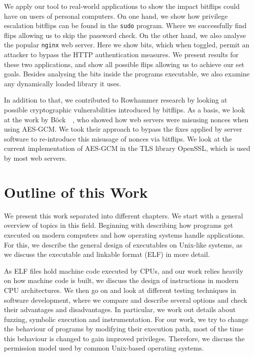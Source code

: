 We apply our tool to real-world applications to show the impact bitflips could
have on users of personal computers. On one hand, we show how privilege
escalation bitflips can be found in the \texttt{sudo} program. Where we
successfully find flips allowing us to skip the password check. On the other
hand, we also analyse the popular \texttt{nginx} web server. Here we show bits,
which when toggled, permit an attacker to bypass the HTTP authentication
measures. We present results for these two applications, and show all possible
flips allowing us to achieve our set goals. Besides analysing the bits inside
the program\textquotesingle s executable, we also examine any dynamically loaded
library it uses.

In addition to that, we contributed to Rowhammer research by looking at possible
cryptographic vulnerabilities introduced by bitflips. As a basis, we look at the
work by Böck~\etal~\cite{gcmnonceattack}, who showed how web servers were
misusing nonces when using AES-GCM. We took their approach to bypass the fixes
applied by server software to re-introduce this misusage of nonces via bitflips.
We look at the current implementation of AES-GCM in the TLS library OpenSSL,
which is used by most web servers.

\section{Outline of this Work}

We present this work separated into different chapters. We start with a general
overview of topics in this field. Beginning with describing how programs get
executed on modern computers and how operating systems handle applications. For
this, we describe the general design of executables on Unix-like systems, as we
discuss the executable and linkable format (ELF) in more detail.

As ELF files hold machine code executed by CPUs, and our work relies heavily on
how machine code is built, we discuss the design of instructions in modern
CPU architectures.  We then go on and look at different testing techniques in
software development, where we compare and describe several options and check
their advantages and disadvantages. In particular, we work out details about
fuzzing, symbolic execution and instrumentation. For our work, we try to change
the behaviour of programs by modifying their execution path, most of the time
this behaviour is changed to gain improved privileges. Therefore, we discuss the
permission model used by common Unix-based operating systems.

